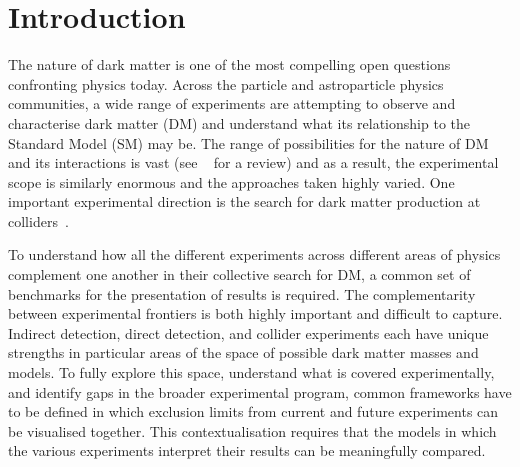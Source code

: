 \documentclass[a4paper, 11pt]{article}
\begin{document}
\maketitle

\vskip10pt


\section{Introduction}
\label{sec:introduction}

The nature of dark matter is one of the most compelling open questions confronting physics today. Across the particle and astroparticle physics communities, a wide range of experiments are attempting to observe and characterise dark matter (DM) and understand what its relationship to the Standard Model (SM) may be. The range of possibilities for the nature of DM and its interactions is vast (see ~\cite{doi:10.1146/annurev-astro-082708-101659} for a review) and as a result, the experimental scope is similarly enormous and the approaches taken highly varied. One important experimental direction is the search for dark matter production at colliders~\cite{Kahlhoefer:2017dnp,doi:10.1146/annurev-nucl-101917-021008}.

To understand how all the different experiments across different areas of physics complement one another in their collective search for DM, a common set of benchmarks for the presentation of results is required. The complementarity between experimental frontiers is both highly important and difficult to capture. Indirect detection, direct detection, and collider experiments each have unique strengths in particular areas of the space of possible dark matter masses and models. To fully explore this space, understand what is covered experimentally, and identify gaps in the broader experimental program, common frameworks have to be defined in which exclusion limits from current and future experiments can be visualised together. This contextualisation requires that the models in which the various experiments interpret their results can be meaningfully compared.
\end{document}
